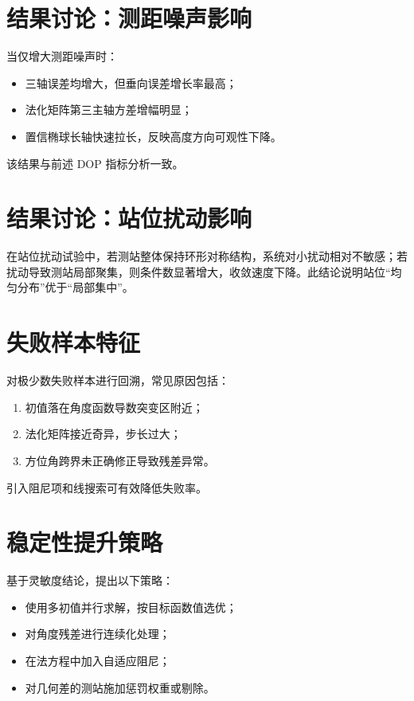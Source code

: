 \section{结果讨论：测距噪声影响}
当仅增大测距噪声时：
\begin{itemize}
  \item 三轴误差均增大，但垂向误差增长率最高；
  \item 法化矩阵第三主轴方差增幅明显；
  \item 置信椭球长轴快速拉长，反映高度方向可观性下降。
\end{itemize}
该结果与前述 DOP 指标分析一致。

\section{结果讨论：站位扰动影响}
在站位扰动试验中，若测站整体保持环形对称结构，系统对小扰动相对不敏感；若扰动导致测站局部聚集，则条件数显著增大，收敛速度下降。此结论说明站位“均匀分布”优于“局部集中”。

\section{失败样本特征}
对极少数失败样本进行回溯，常见原因包括：
\begin{enumerate}
  \item 初值落在角度函数导数突变区附近；
  \item 法化矩阵接近奇异，步长过大；
  \item 方位角跨界未正确修正导致残差异常。
\end{enumerate}
引入阻尼项和线搜索可有效降低失败率。

\section{稳定性提升策略}
基于灵敏度结论，提出以下策略：
\begin{itemize}
  \item 使用多初值并行求解，按目标函数值选优；
  \item 对角度残差进行连续化处理；
  \item 在法方程中加入自适应阻尼；
  \item 对几何差的测站施加惩罚权重或剔除。
\end{itemize}

